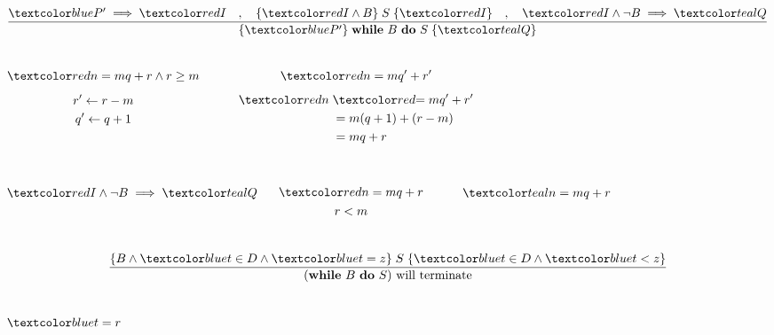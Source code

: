 \begin{frame}
  \[
    \dfrac{\blue{P'} \implies \red{I} \quad,\quad \{\red{I} \land B\}\; S\; \{\red{I}\}
    \quad,\quad \red{I} \land \lnot B \implies \teal{Q}}
    {\{\blue{P'}\}\; \textbf{while}\ B\ \textbf{do}\ S\; \{\teal{Q}\}}
  \]
  
  \begin{columns}
      \setcounter{equation}{0}
      \begin{gather}
        \red{n = mq + r} \land r \ge m \\[5pt]
        r' \gets r - m \\
        q' \gets q + 1
      \end{gather}
      \hrule
      \begin{gather}
        \red{n = mq' + r'}
      \end{gather}
      \begin{align*}
        \red{n}\; & \red{= mq' + r'} \\
          &= m (q + 1) + (r - m) \\
          &= mq + r
      \end{align*}
  \end{columns}
\end{frame}

\begin{frame}
  \begin{columns}
      
      \[
        \red{I} \land \lnot B \implies \teal{Q}
      \]
        
      \pause
      \vspace{-0.30cm}
      \setcounter{equation}{0}
      \begin{gather}
        \red{n = mq + r} \\
        r < m
      \end{gather}
      \hrule
      \begin{gather}
        \teal{n = mq + r}
      \end{gather}
  \end{columns}
\end{frame}

\begin{frame}
  \[
    \dfrac{\{B \land \blue{t \in D} \land \blue{t = z}\}\; S\; \{\blue{t \in D} \land \blue{t < z} \}}
    {(\textbf{while}\ B\ \textbf{do}\ S) \text{ will terminate}}
  \]
  
  \begin{columns}
      
      \pause
      \[
        \blue{t = r}
      \]
  \end{columns}
\end{frame}
